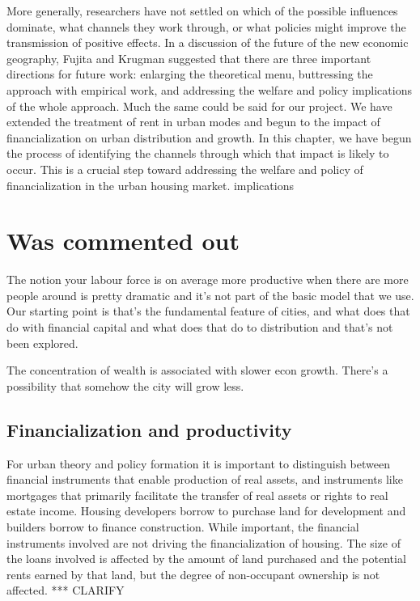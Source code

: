 \documentclass[a4paper]{article}
\theoremstyle{definition}
\theoremstyle{plain}
\begin{document}
{ More generally, researchers have not settled on which of the possible influences dominate, what channels they work through, or what policies might improve the transmission of positive effects. %
In a discussion of the future of the new economic geography, Fujita and Krugman suggested that there are three important directions for future work: enlarging the theoretical menu, buttressing the approach with empirical work, and addressing the welfare and policy implications of the whole approach. Much the same could be said for our project. We have extended the treatment of rent in urban modes and begun to the impact of financialization on urban distribution and growth. In this chapter, we have begun the process of identifying the channels through which that impact is likely to occur. This is a crucial step toward addressing the welfare and policy of financialization in the urban housing market.
 implications



\section{Was commented out}
The notion     your labour force is on average more productive when there are more people around is pretty dramatic and it's not part of the basic model that we use. Our starting point is that's the fundamental feature of cities, and what does that do with financial capital and what does that do to distribution and that's not been explored. 

The concentration of wealth is associated with slower econ growth.  There's a possibility that somehow the city will grow less.




\subsection{Financialization and productivity}

For urban theory and policy formation it is important to distinguish between financial instruments that enable production of real assets, and instruments like  mortgages that primarily facilitate the transfer of real assets or rights to real estate income. Housing developers borrow to purchase land for development and builders borrow to finance construction. While important, the financial instruments involved are not driving the financialization of housing.  The size of the loans involved is affected by the amount of land purchased and the potential rents earned by that land, but the degree of non-occupant ownership is not affected. *** CLARIFY

}
\end{document}
